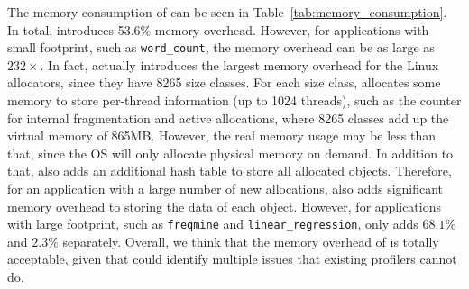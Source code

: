 The memory consumption of \MP{} can be seen in Table~\ref{tab:memory_consumption}. In total, 
\MP{} introduces 53.6\% memory overhead. However, for applications with small footprint, such as 
\texttt{word\_count}, the memory overhead can be as large as $232\times$. 
In fact, \MP{} actually introduces 
the largest memory overhead for the Linux allocators, since they have 8265
size classes. For each size class, \MP{} allocates some memory to store per-thread information (up to 1024 threads), such as the counter for internal fragmentation and active allocations, where 8265 classes add up the virtual memory of 865MB. However, the real memory usage may be less than that, since the OS will only allocate physical memory on demand. In addition to that, \MP{} also adds an additional hash table to store all allocated objects.  Therefore, for an application with a large number of new allocations, \MP{} also adds significant memory overhead to storing the data of each object.
However, for applications with large footprint, such as \texttt{freqmine} and \texttt{linear\_regression}, \MP{} only adds $68.1\%$ and $2.3\%$ separately. Overall, we think that the memory overhead of \MP{} is totally acceptable, given that \MP{} could identify multiple issues that existing profilers cannot do. 


